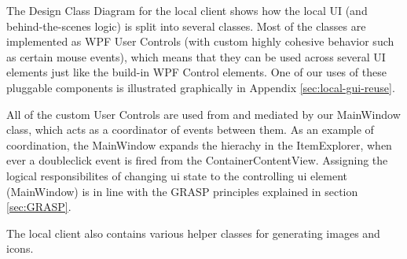 The Design Class Diagram for the local client shows how the local UI (and behind-the-scenes logic) is split into several classes. Most of the classes are implemented as WPF User Controls (with custom highly cohesive behavior such as certain mouse events), which means that they can be used across several UI elements just like the build-in WPF Control elements. One of our uses of these pluggable components is illustrated graphically in Appendix  \ref{sec:local-gui-reuse}.

All of the custom User Controls are used from and mediated by our MainWindow class, which acts as a coordinator of events between them. As an example of coordination, the MainWindow expands the hierachy in the ItemExplorer, when ever a doubleclick event is fired from the ContainerContentView. Assigning the logical responsibilites of changing ui state to the controlling ui element (MainWindow) is in line with the GRASP principles explained in section \ref{sec:GRASP}.

The local client also contains various helper classes for generating images and icons.
